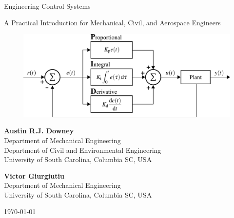 \documentclass[12pt,letter]{article}
\begin{document}
\begin{center}
	{\fontsize{40}{50}\selectfont Engineering Control Systems}

	\vspace{1cm}


	
	\begin{center}
	\begin{minipage}{0.75\textwidth}
		\centering
       	{\LARGE{} A Practical Introduction for Mechanical, Civil, and Aerospace Engineers}
	\end{minipage}
	\end{center}
	
	\vspace{2cm}
	
	\begin{figure}[H]
		\includegraphics[width=6.5in]{figures/PID_controller.png}
		\label{fig:title_figure}
	\end{figure} 
	
	\vspace{2cm}
	
	\textbf{Austin R.J. Downey}\\ Department of Mechanical Engineering \\ Department of Civil and Environmental Engineering \\ University of South Carolina, Columbia SC, USA 
	
	\vspace{1.5cm}
	
	\textbf{Victor Giurgiutiu}\\  Department of Mechanical Engineering \\ University of South Carolina, Columbia SC, USA 
	
	\vspace{1cm}
	
	\today
\end{center}

\pagebreak
\end{document}
